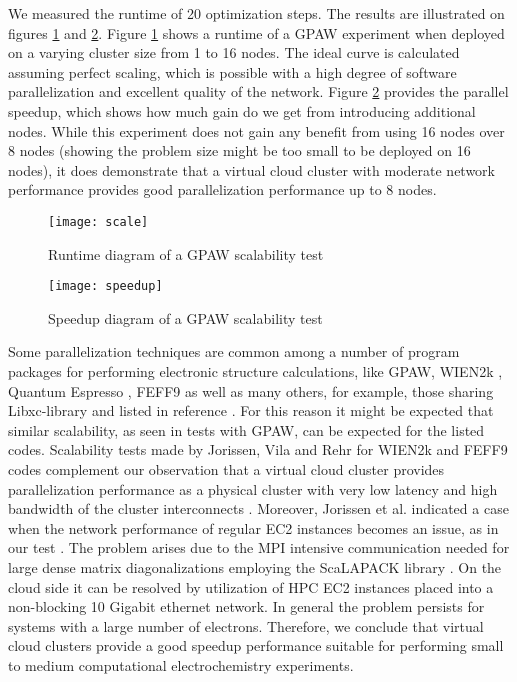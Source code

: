 \documentclass[a4paper,10pt]{article}
\begin{document}
We measured the runtime of 20 optimization steps. The results are illustrated on figures \ref{fig:scale1} and \ref{fig:scale}. Figure  \ref{fig:scale1} shows a runtime of a GPAW experiment when deployed on a varying cluster size from 1 to 16 nodes. The ideal curve is calculated assuming perfect scaling, which is possible with a high degree of software parallelization and excellent quality of the network. Figure \ref{fig:scale} provides the parallel speedup, which shows how much gain do we get from introducing additional nodes. While this experiment does not gain any benefit from using 16 nodes over 8 nodes (showing the problem size might be too small to be deployed on 16 nodes), it does demonstrate that a virtual cloud cluster with moderate network performance provides good parallelization performance up to 8 nodes. 


\begin{figure}
\centering
\texttt{[image: scale]}
\caption{Runtime diagram of a GPAW scalability test}
\label{fig:scale1}
\end{figure}

\begin{figure}
\centering
\texttt{[image: speedup]}
\caption{Speedup diagram of a GPAW scalability test}
\label{fig:scale}
\end{figure}

Some parallelization techniques are common among a number of program packages for performing electronic structure calculations, like GPAW, WIEN2k \cite{wien2k},  Quantum Espresso \cite{QE2009}, FEFF9 \cite{FEFF9} as well as many others, for example, those sharing Libxc-library and listed in reference \cite{libxc}. For this reason it might be expected that similar scalability, as seen in tests
with GPAW, can be expected for the listed codes. Scalability tests made by Jorissen, Vila and Rehr for WIEN2k and FEFF9 codes complement our observation that a virtual cloud cluster provides parallelization performance as a physical cluster with very low latency and high bandwidth of the cluster interconnects \cite{Jorissen2012}. Moreover, Jorissen et al. indicated a case when the network performance of regular EC2 instances becomes an issue, as in our test \cite{Jorissen2012}. The problem arises due to the MPI intensive communication needed for large dense matrix diagonalizations employing the ScaLAPACK library \cite{scalapack}. On the cloud side it can be resolved by utilization of HPC EC2 instances placed into a non-blocking 10 Gigabit ethernet network. In general the problem persists for systems with a large number of electrons. Therefore, we conclude that virtual cloud clusters provide a good speedup performance suitable for performing small to medium computational electrochemistry experiments. 
\end{document}
